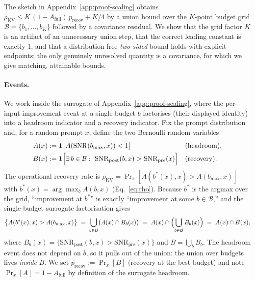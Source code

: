 The sketch in Appendix~\ref{app:proof-scaling} obtains
$\rho_{\mathrm{KV}} \le K\,(1-A_{\mathrm{full}})\,p_{\mathrm{recov}} + K/4$
by a union bound over the $K$-point budget grid $\mathcal{B}=\{b_1,\dots,b_K\}$
followed by a covariance residual. We show that the grid factor $K$ is an
artifact of an unnecessary union step, that the correct leading constant is
exactly $1$, and that a distribution-free \emph{two-sided} bound holds with
explicit endpoints; the only genuinely unresolved quantity is a covariance,
for which we give matching, attainable bounds.

\paragraph{Events.} We work inside the surrogate of
Appendix~\ref{app:proof-scaling}, where the per-input improvement event at a
single budget $b$ factorises (their displayed identity) into a headroom
indicator and a recovery indicator. Fix the prompt distribution and, for a
random prompt $x$, define the two Bernoulli random variables
\begin{align}
\label{eq:AB-def}
A(x) &:= \mathbf{1}\bigl[\hat A(\mathrm{SNR}(b_{\max},x)) < 1\bigr]
&&\text{(headroom)}, \notag \\
B(x) &:= \mathbf{1}\Bigl[\exists\, b\in\mathcal{B}:\
   \mathrm{SNR}_{\mathrm{post}}(b,x) > \mathrm{SNR}_{\mathrm{pre}}(x)\Bigr]
&&\text{(recovery)} .
\end{align}
The operational recovery rate is $\rho_{\mathrm{KV}} = \Pr_x[A(b^*(x),x) > A(b_{\max},x)]$
with $b^*(x)=\arg\max_b A(b,x)$ (Eq.~\eqref{eq:rho}). Because $b^*$ is the
argmax over the grid, ``improvement at $b^*$'' is exactly ``improvement at some
$b\in\mathcal{B}$,'' and the single-budget surrogate factorisation gives
\begin{equation}
\label{eq:AandB}
\bigl\{A(b^*(x),x) > A(b_{\max},x)\bigr\}
\;=\; \bigcup_{b\in\mathcal{B}}\bigl(A(x)\cap B_b(x)\bigr)
\;=\; A(x)\cap\Bigl(\bigcup_{b\in\mathcal{B}}B_b(x)\Bigr)
\;=\; A(x)\cap B(x),
\end{equation}
where $B_b(x)=\{\mathrm{SNR}_{\mathrm{post}}(b,x)>\mathrm{SNR}_{\mathrm{pre}}(x)\}$
and $B=\bigcup_b B_b$. The headroom event does not depend on $b$, so it pulls
out of the union: the union over budgets lives \emph{inside} $B$. We set
$p_{\mathrm{recov}} := \Pr_x[B]$ (recovery at the best budget) and note
$\Pr_x[A] = 1-A_{\mathrm{full}}$ by definition of the surrogate headroom.


